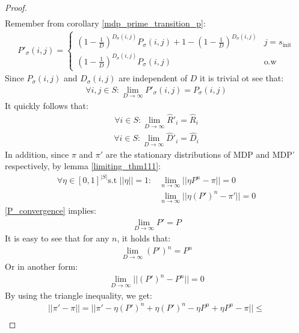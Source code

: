 \documentclass{article}
\begin{document}
\begin{proof}
\begin{gather*}
    \end{gather*}
    Remember from corollary \ref{mdp_prime_transition_p}:
    \begin{gather*}
        P'_\sigma(i,j) =
        \begin{cases}
            \left( 1 - \frac{1}{D} \right)^{D_\sigma(i,j)} P_\sigma(i,j) + 1 - \left( 1 - \frac{1}{D} \right)^{D_\sigma(i,j)} & j = s_\text{init} \\
            \left( 1 - \frac{1}{D} \right)^{D_\sigma(i,j)} P_\sigma(i,j) & \text{o.w}
        \end{cases}
    \end{gather*}
    Since $P_\sigma(i,j)$ and $D_\sigma(i,j)$ are independent of $D$ it is trivial ot see that:
    \begin{gather}\label{P_convergence}
        \forall i,j \in S: \lim\limits_{D \to \infty} P'_\sigma(i,j) = P_\sigma(i,j)
    \end{gather}
    It quickly follows that:
    \begin{gather*}
        \forall i \in S: \lim\limits_{D \to \infty} \hat{R}'_i = \hat{R}_i
    \end{gather*}
    \begin{gather*}
        \forall i \in S: \lim\limits_{D \to \infty} \hat{D}'_i = \hat{D}_i
    \end{gather*}
    In addition, since $\pi$ and $\pi'$ are the stationary distributions of MDP and MDP' respectively, by lemma \ref{limiting_thm111}:
    \begin{align*}
        \forall \eta \in [0,1]^{|S|} \text{s.t } ||\eta|| = 1: &
        \lim\limits_{n \to \infty} ||\eta P^n - \pi|| = 0 \\
        & \lim\limits_{n \to \infty} ||\eta (P')^n - \pi'|| = 0
    \end{align*}
    \eqref{P_convergence} implies:
    \begin{gather*}
        \lim\limits_{D \to \infty} P' = P
    \end{gather*}
    It is easy to see that for any $n$, it holds that:
    \begin{gather*}
        \lim\limits_{D \to \infty} (P')^n = P^n
    \end{gather*}
    Or in another form:
    \begin{gather*}
        \lim\limits_{D \to \infty} ||(P')^n - P^n|| = 0
    \end{gather*}
    By using the triangle inequality, we get:
    \begin{gather*}
        ||\pi' - \pi|| = ||\pi' - \eta (P')^n + \eta (P')^n - \eta P^n + \eta P^n - \pi|| \leq \\

\end{gather*}
\end{proof}
\end{document}
